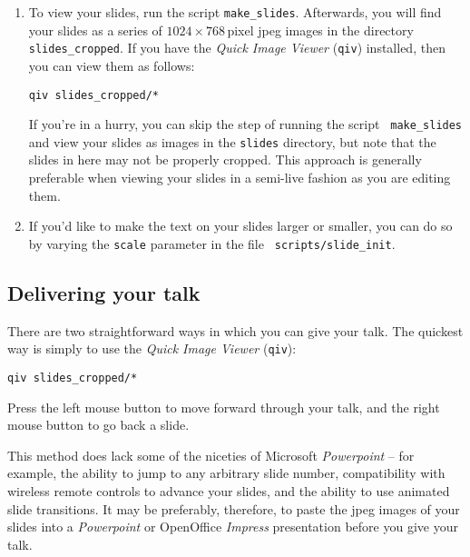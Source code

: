 \begin{enumerate}
\begin{verbatim}
text '\Large \bf The Results of Our Model' at x*50, y*92
set axescolour yellow ; set nogrid
set origin x*17.5, y*20 ; set width x*70
set xrange [0.01:0.7]
set xlabel '$x$'
set yrange [0.01:0.7]
set ylabel '$f(x)$'
set palette Red, Green, Orange, Purple

set key top left
plot x t 'Model 1', exp(x)-1 t 'Model 2', \
     log(x+1) t 'Model 3', sin(x) t 'Model 4'

load 'scripts/slide_finish'
\end{verbatim}
\item To view your slides, run the script {\tt make\_slides}. Afterwards, you
will find your slides as a series of $1024\times768$\,pixel jpeg images in the
directory {\tt slides\_cropped}.  If you have the {\it Quick Image
Viewer}\index{Quick Image Viewer} ({\tt qiv}) installed, then you can view them
as follows:
\begin{verbatim}
qiv slides_cropped/*
\end{verbatim}
If you're in a hurry, you can skip the step of running the script {\tt
make\_slides} and view your slides as images in the {\tt slides} directory, but
note that the slides in here may not be properly cropped. This approach is
generally preferable when viewing your slides in a semi-live fashion as you are
editing them.
\item If you'd like to make the text on your slides larger or smaller, you can
do so by varying the {\tt scale} parameter in the file {\tt
scripts/slide\_init}.
\end{enumerate}


\subsection{Delivering your talk}

There are two straightforward ways in which you can give your talk. The
quickest way is simply to use the {\it Quick Image Viewer}\index{Quick Image
Viewer} ({\tt qiv}):
\begin{verbatim}
qiv slides_cropped/*
\end{verbatim}
Press the left mouse button to move forward through your talk, and the right
mouse button to go back a slide.

This method does lack some of the niceties of Microsoft {\it Powerpoint} -- for
example, the ability to jump to any arbitrary slide number, compatibility with
wireless remote controls to advance your slides, and the ability to use
animated slide transitions. It may be preferably, therefore, to paste the jpeg
images of your slides into a {\it Powerpoint} or OpenOffice {\it Impress}
presentation before you give your talk.

